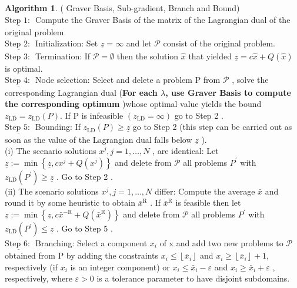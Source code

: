 \documentclass{article}
\theoremstyle{plain}
\theoremstyle{definition}
\newtheorem{algorithm}[theorem]{Algorithm}
\begin{document}
\begin{algorithm}( Graver Basis, Sub-gradient, Branch and Bound)\\
\noindent $ \underline{\text {Step 1: }}$ Compute the Graver Basis of the matrix of the Lagrangian dual of the original problem \\
\noindent $ \underline{\text {Step 2: }}$  Initialization: Set  $\underline{z}=\infty$  and let $ \mathscr{P}$  consist of the original problem. \\
\noindent $ \underline{\text {Step 3: }}$ Termination: If  $\mathscr{P}=\emptyset$  then the solution  $\hat{x}$  that yielded  $\underline{z}=c \hat{x}+Q(\hat{x})$  is optimal.\\
\noindent $ \underline{\text {Step 4: }}$ Node selection: Select and delete a problem  P  from  $\mathscr{P}$ , solve the corresponding Lagrangian dual (\textbf{For each $\lambda$, use Graver Basis to compute the corresponding optimum  })whose optimal value yields the bound  $z_{\mathrm{LD}}=z_{\mathrm{LD}}(P) $. If  P  is infeasible  $\left(z_{\mathrm{LD}}=\infty\right)$  go to Step 2 .\\
\noindent $ \underline{\text {Step 5: }}$ Bounding: If  $z_{\mathrm{LD}}(P) \geqslant \underline{z}$  go to Step 2 (this step can be carried out as soon as the value of the Lagrangian dual falls below  $\underline{z}$  ).\\
\indent (i) The scenario solutions  $x^{j}, j=1, \ldots, N$ , are identical: Let  $\underline{z}:=\min \left\{\underline{z}, c x^{j}+Q\left(x^{j}\right)\right\}$  and delete from  $\mathscr{P}$  all problems  $P^{\prime}$  with  $z_{\mathrm{LD}}\left(P^{\prime}\right) \geqslant \underline{z}$ . Go to Step 2 .\\
\indent (ii) The scenario solutions  $x^{j}, j=1, \ldots, N$  differ: Compute the average  $\bar{x}$  and round it by some heuristic to obtain  $\bar{x}^{\mathrm{R}}$ . If  $\bar{x}^{\mathrm{R}}$  is feasible then let  $\underline{z}:=\min \left\{\underline{z}, c \bar{x}^{-\mathrm{R}}+Q\left(\bar{x}^{\mathrm{R}}\right)\right\}$  and delete from  $\mathscr{P}$  all problems  $P^{\prime}$  with  $z_{\mathrm{LD}}\left(P^{\prime}\right) \leqslant \underline{z}$ . Go to Step 5 .\\
\noindent $ \underline{\text {Step 6: }}$ Branching: Select a component  $x_{i}$  of  x  and add two new problems to  $\mathscr{P}$  obtained from  P  by adding the constraints  $x_{i} \leqslant\left\lfloor\bar{x}_{i}\right\rfloor$  and  $x_{i} \geqslant\left\lfloor\bar{x}_{i}\right\rfloor+1$, respectively (if  $x_{i}$  is an integer component) or $ x_{i} \leqslant \bar{x}_{i}-\varepsilon$  and  $x_{i} \geqslant \bar{x}_{i}+\varepsilon$ , respectively, where  $\varepsilon>0$  is a tolerance parameter to have disjoint subdomains.
\end{algorithm}
\end{document}
